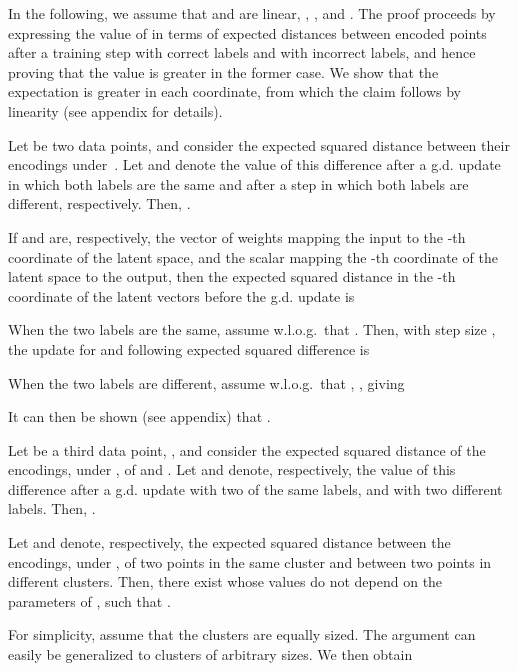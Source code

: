 \documentclass[runningheads]{llncs}
\begin{document}
In the following, we assume that  and  are linear, , , and . The proof proceeds by expressing the value of  in terms of expected distances between encoded points after a training step with correct labels and with incorrect labels, and hence proving that the value is greater in the former case. We  show that the expectation is greater in each coordinate, from which the claim follows by linearity (see appendix for details).

\begin{lemma} \label{lemma:smaller-dist-if-same}
    Let  be two data points, and consider the expected squared distance between their encodings under~. Let  and  denote the value of this difference after a g.d. update in which both labels are the same and after a step in which both labels are different, respectively. Then, . 
\end{lemma}

If  and  are, respectively, the vector of weights mapping the input to the -th coordinate of the latent space, and the scalar mapping the -th coordinate of the latent space to the output, then the expected squared distance in the -th coordinate of the latent vectors before the g.d. update is 

When the two labels are the same, assume w.l.o.g.~that . Then, with step size  , the update for  and following expected squared difference  is 

When the two labels are different, assume w.l.o.g.~that , , giving
 
It can then be shown (see appendix) that . 

 
\begin{lemma} \label{lemma:equal-distance-from-3rd}
    Let  be a third data point, , and consider the expected squared distance of the encodings, under , of  and . Let  and  denote, respectively, the value of this difference after a g.d. update with two of the same labels, and with two different labels. Then, .
\end{lemma}

\begin{lemma} \label{lemma:same-diff-decomp}
    Let  and  denote, respectively, the expected squared distance between the encodings, under , of two points in the same cluster and between two points in different clusters. Then, there exist  whose values do not depend on the parameters of , such that .
\end{lemma}
For simplicity, assume that the clusters are equally sized. The argument can easily be generalized to clusters of arbitrary sizes. We then obtain 
\end{document}

